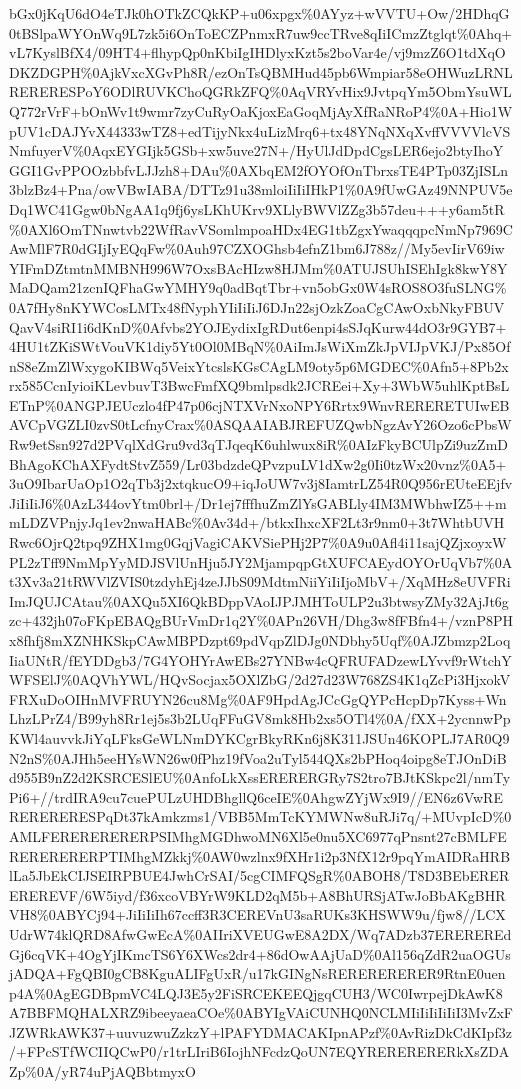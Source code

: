 \documentclass[]{article}
\begin{document}
bGx0jKqU6dO4eTJk0hOTkZCQkKP+u06xpgx\%0AYyz+wVVTU+Ow/2HDhqG0tBSlpaWYOnWq9L7zk5i6OnToECZPnmxR7uw9ccTRve8qIiICmzZtglqt\%0Ahq+vL7KyslBfX4/09HT4+flhypQp0nKbiIgIHDlyxKzt5s2boVar4e/vj9mzZ6O1tdXqODKZDGPH\%0AjkVxcXGvPh8R/ezOnTsQBMHud45pb6Wmpiar58eOHWuzLRNLRERERESPoY6ODlRUVKChoQGRkZFQ\%0AqVRYvHix9JvtpqYm5ObmYsuWLQ772rVrF+bOnWv1t9wmr7zyCuRyOaKjoxEaGoqMjAyXfRaNRoP4\%0A+Hio1WpUV1cDAJYvX44333wTZ8+edTijyNkx4uLizMrq6+tx48YNqNXqXvffVVVVlcVSNmfuyerV\%0AqxEYGIjk5GSb+xw5uve27N+/HyUlJdDpdCgsLER6ejo2btyIhoYGGI1GvPPOOzbbfvLJJzh8+DAu\%0AXbqEM2fOYOfOnTbrxsTE4PTp03ZjISLn3blzBz4+Pna/owVBwIABA/DTTz91u38mloiIiIiIHkP1\%0A9fUwGAz49NNPUV5eDq1WC41Ggw0bNgAA1q9fj6ysLKhUKrv9XLlyBWVlZZg3b57deu+++y6am5tR\%0AXl6OmTNnwtvb22WfRavVSomlmpoaHDx4EG1tbZgxYwaqqqpcNmNp7969CAwMlF7R0dGIjIyEQqFw\%0Auh97CZXOGhsb4efnZ1bm6J788z//My5evIirV69iwYIFmDZtmtnMMBNH996W7OxsBAcHIzw8HJMm\%0ATUJSUhISEhIgk8kwY8YMaDQam21zcnIQFhaGwYMHY9q0adBqtTbr+vn5obGx0W4sROS8O3fuSLNG\%0A7fHy8nKYWCosLMTx48fNyphYIiIiIiJ6DJn22sjOzkZoaCgCAwOxbNkyFBUVQavV4siRI1i6dKnD\%0Afvbs2YOJEydixIgRDut6enpi4sSJqKurw44dO3r9GYB7+4HU1tZKiSWtVouVK1diy5Yt0Ol0MBqN\%0AiImJsWiXmZkJpVIJpVKJ/Px85OfnS8eZmZlWxygoKIBWq5VeixYtcslsKGsCAgLM9oty5p6MGDEC\%0Afn5+8Pb2xrx585CcnIyioiKLevbuvT3BwcFmfXQ9bmlpsdk2JCREei+Xy+3WbW5uhlKptBsLETnP\%0ANGPJEUczlo4fP47p06cjNTXVrNxoNPY6Rrtx9WnvRERERETUIwEBAVCpVGZLI0zvS0tLcfnyCrax\%0ASQAAIABJREFUZQwbNgzAvY26Ozo6cPbsWRw9etSsn927d2PVqlXdGru9vd3qTJqeqK6uhlwux8iR\%0AIzFkyBCUlpZi9uzZmDBhAgoKChAXFydtStvZ559/Lr03bdzdeQPvzpuLV1dXw2g0Ii0tzWx20vnz\%0A5+3uO9IbarUaOp1O2qTb3j2xtqkucO9+iqJoUW7v3j8IamtrLZ54R0Q956rEUteEEjfvJiIiIiJ6\%0AzL344ovYtm0brl+/Dr1ej7fffhuZmZlYsGABLly4IM3MWbhwIZ5++mmLDZVPnjyJq1ev2nwaHABc\%0Av34d+/btkxIhxcXF2Lt3r9nm0+3t7WhtbUVHRwc6OjrQ2tpq9ZHX1mg0GqjVagiCAKVSiePHj2P7\%0A9u0Afl4i11sajQZjxoyxWPL2zTff9NmMpYyMDJSVlUnHju5JY2MjampqpGtXUFCAEydOYOrUqVb7\%0At3Xv3a21tRWVlZVIS0tzdyhEj4zeJJbS09MdtmNiiYiIiIjoMbV+/XqMHz8eUVFRiImJQUJCAtau\%0AXQu5XI6QkBDppVAoIJPJMHToULP2u3btwsyZMy32AjJt6gzc+432jh07oFKpEBAQgBUrVmDr1q2Y\%0APn26VH/Dhg3w8fFBfn4+/vznP8PHx8fhfj8mXZNHKSkpCAwMBPDzpt69pdVqpZlDJg0NDbhy5Uqf\%0AJZbmzp2LoqIiaUNtR/fEYDDgb3/7G4YOHYrAwEBs27YNBw4cQFRUFADzewLYvvf9rWtchYWFSElJ\%0AQVhYWL/HQvSocjax5OXlZbG/2d27d23W768ZS4K1qZcPi3HjxokVFRXuDoOIHnMVFRUYN26cu8Mg\%0AF9HpdAgJCcGgQYPcHcpDp7Kyss+WnLhzLPrZ4/B99yh8Rr1ej5s3b2LUqFFuGV8mk8Hb2xs5OTl4\%0A/fXX+2ycnnwPpKWl4auvvkJiYqLFksGeWLNmDYKCgrBkyRKn6j8K311JSUn46KOPLJ7AR0Q9N2nS\%0AJHh5eeHYsWN26w0fPhz19fVoa2uTyl544QXs2bPHoq4oipg8eTJOnDiBd955B9nZ2d2KSRCESlEU\%0AnfoLkXssERERERGRy7S2tro7BJtKSkpc2l/nmTyPi6+//trdIRA9cu7cuePULzUHDBhgllQ6ceIE\%0AhgwZYjWx9I9//EN6z6VwRERERERERESPqDt37kAmkzms1/VBB5MmTcKYMWNw8uRJi7q/+MUvpIcD\%0AMLFERERERERERPSIMhgMGDhwoMN6Xl5e0nu5XC6977qPnsnt27cBMLFERERERERERPTIMhgMZkkj\%0AW0wzlnx9fXHr1i2p3NfX12r9pqYmAIDRaHRBlLa5JbEkCIJSEIRPBUE4JwhCrSAI/5cgCIMFQSgR\%0ABOH8/T8D3BEbEREREREREVF/6W5iyd/f36xcoVBYrW9KLD2qM5b+A8BhURSjATwJoBbAKgBHRVH8\%0ABYCj94+JiIiIiIh67ccff3R3CEREVnU3saRUKs3KHSWW9u/fjw8//LCXUdrW74klQRD8AfwGwEcA\%0AIIriXVEUGwE8A2DX/Wq7ADzb37EREREREdGj6cqVK+4OgYjIKmcTS6Y6XWcs2dr4+86dOwAAjUaD\%0Al156qZdR2uaOGUsjADQA+FgQBI0gCB8KguALIFgUxR/u17kGINgNsRERERERERER9RtnE0uenp4A\%0AgEGDBpmVC4LQJ3E5y2FiSRCEKEEQjgqCUH3/WC0IwrpejDkAwK8A7BBFMQHALXRZ9ibeeyaeaCOe\%0ABYIgVAiCUNHQ0NCLMIiIiIiIiIiI3MvZxFJZWRkAWK37+uuvuzwuZzkzY+lPAFYDMACAKIpnAPzf\%0AvRizDkCdKIpf3z/+FPcSTfWCIIQCwP0/r1trLIriB6IojhNFcdzQoUN7EQYRERERERERkXsZDAZp\%0A/yR74uPjAQBbtmyxO
\end{document}

